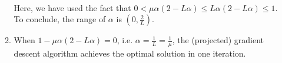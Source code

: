 \begin{exercise}
\begin{enumerate}
\begin{solution}
\begin{enumerate}
\begin{align*}
                        \end{align*}
                        Here, we have used the fact that $0 < \mu\alpha(2-L\alpha) \le L\alpha(2-L\alpha) \le 1$. To conclude, the range of $\alpha$ is $(0, \frac{2}{L})$.
                    \item When $1 -\mu\alpha(2-L\alpha) = 0$, i.e. $\alpha = \frac{1}{L} = \frac{1}{\mu} $, the (projected) gradient descent algorithm achieves the optimal solution in one iteration.
                        \qedhere
                \end{enumerate}
            \end{solution}

    \end{enumerate}
\end{exercise}
\clearpage



